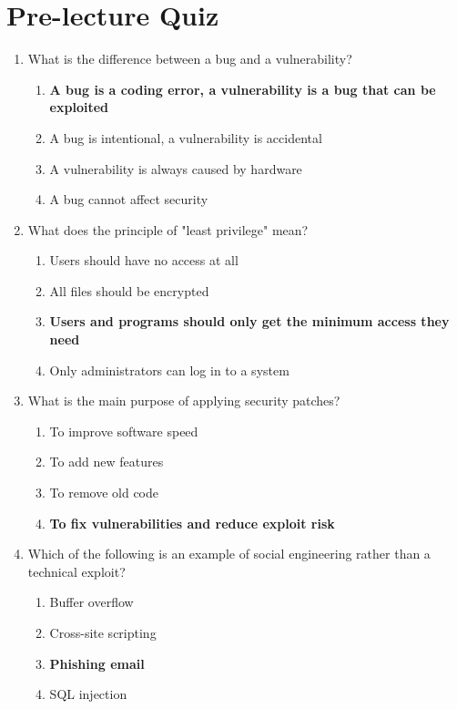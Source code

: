 \newpage

\section{Pre-lecture Quiz}

\begin{enumerate}
    \item What is the difference between a bug and a vulnerability?
    \begin{enumerate}
        \item \textbf{A bug is a coding error, a vulnerability is a bug that can
              be exploited}
        \item A bug is intentional, a vulnerability is accidental
        \item A vulnerability is always caused by hardware
        \item A bug cannot affect security
    \end{enumerate}

    \item What does the principle of "least privilege" mean?
    \begin{enumerate}
        \item Users should have no access at all
        \item All files should be encrypted
        \item \textbf{Users and programs should only get the minimum access they
              need}
        \item Only administrators can log in to a system
    \end{enumerate}

    \item What is the main purpose of applying security patches?
    \begin{enumerate}
        \item To improve software speed
        \item To add new features
        \item To remove old code
        \item \textbf{To fix vulnerabilities and reduce exploit risk}
    \end{enumerate}

    \item Which of the following is an example of social engineering rather than
          a technical exploit?
    \begin{enumerate}
        \item Buffer overflow
        \item Cross-site scripting
        \item \textbf{Phishing email}
        \item SQL injection
    \end{enumerate}


\end{enumerate}
